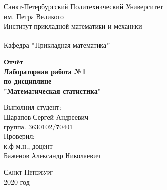 \documentclass[a4]{article}
\begin{document}
	\def\contentsname{\LARGE{Содержание}}
	\thispagestyle{empty}
	\begin{center} 
		\vspace{2cm} 
		{\Large \sc Санкт-Петербургский Политехнический Университет}\\
		\vspace{2mm}
		{\Large\sc им. Петра Великого}\\
		\vspace{1cm}
		{\large \sc Институт прикладной математики и механики\\ 
			\vspace{0.5mm}
			\textsc{}}\\ 
		\vspace{0.5mm}
		{\large\sc Кафедра $"$Прикладная математика$"$}\\
		\vspace{15mm}
		
		
		{\sc \textbf{Отчёт\\
			Лабораторная работа №1\\
			по дисциплине\\
			"Математическая статистика"}
			\vspace{6mm}
			
		}
		\vspace*{2mm}
		
		
		\begin{flushleft}
			\vspace{4cm}
			\sc Выполнил студент:\\
			\sc Шарапов Сергей Андреевич\\
			\sc группа: 3630102/70401\\
			\vspace{1cm}
			\sc Проверил:\\
			\sc к.ф-м.н., доцент\\
			\sc Баженов Александр Николаевич
			\vspace{20mm}
		\end{flushleft}
	\end{center} 
	\begin{center}
		\vfill {\large\textsc{Санкт-Петербург}}\\ 
		2020 год
	\end{center}
	
	\newpage
	\pagestyle{plain}
	
	
	
\end{document}
